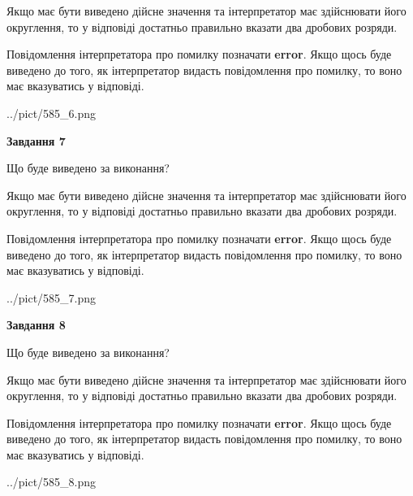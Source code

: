 \documentclass[12pt, ukrainian]{article}
\begin{document}
{\begin {Large}
Якщо має бути виведено дійсне значення та інтерпретатор має здійснювати його округлення, 
то у відповіді достатньо правильно вказати два дробових розряди.

Повідомлення інтерпретатора про помилку позначати \textbf{error}.
Якщо щось буде виведено до того, як інтерпретатор видасть повідомлення про помилку, 
то воно має вказуватись у відповіді. \par

\begin{center}
	{../pict/585_6.png}
\end{center}
\newpage

{\begin {center}\textbf{Завдання 7}\end {center}}\par
Що буде виведено за виконання? \par

Якщо має бути виведено дійсне значення та інтерпретатор має здійснювати його округлення, 
то у відповіді достатньо правильно вказати два дробових розряди.

Повідомлення інтерпретатора про помилку позначати \textbf{error}.
Якщо щось буде виведено до того, як інтерпретатор видасть повідомлення про помилку, 
то воно має вказуватись у відповіді. \par

\begin{center}
	{../pict/585_7.png}
\end{center}
\newpage

{\begin {center}\textbf{Завдання 8}\end {center}}\par
Що буде виведено за виконання? \par

Якщо має бути виведено дійсне значення та інтерпретатор має здійснювати його округлення, 
то у відповіді достатньо правильно вказати два дробових розряди.

Повідомлення інтерпретатора про помилку позначати \textbf{error}.
Якщо щось буде виведено до того, як інтерпретатор видасть повідомлення про помилку, 
то воно має вказуватись у відповіді. \par

\begin{center}
	{../pict/585_8.png}
\end{center}
\newpage


\end{Large}}
\end{document}
